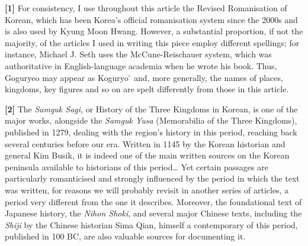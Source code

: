 \documentclass[11pt,a4paper]{article}
\begin{document}
\textbf{{[}1{]}} For consistency, I use throughout this article the Revised Romanisation of Korean, which has been Korea's official romanisation system since the 2000s and is also used by Kyung Moon Hwang. However, a substantial proportion, if not the majority, of the articles I used in writing this piece employ different spellings; for instance, Michael J. Seth uses the McCune-Reischauer system, which was authoritative in English-language academia when he wrote his book. Thus, Goguryeo may appear as Koguryo ̆ and, more generally, the names of places, kingdoms, key figures and so on are spelt differently from those in this article.

\textbf{{[}2{]}} The \emph{Samguk Sagi}, or History of the Three Kingdoms in Korean, is one of the major works, alongside the \emph{Samguk Yusa} (Memorabilia of the Three Kingdoms), published in 1279, dealing with the region's history in this period, reaching back several centuries before our era. Written in 1145 by the Korean historian and general Kim Busik, it is indeed one of the main written sources on the Korean peninsula available to historians of this period\ldots{} Yet certain passages are particularly romanticised and strongly influenced by the period in which the text was written, for reasons we will probably revisit in another series of articles, a period very different from the one it describes. Moreover, the foundational text of Japanese history, the \emph{Nihon Shoki}, and several major Chinese texts, including the \emph{Shiji} by the Chinese historian Sima Qian, himself a contemporary of this period, published in 100 BC, are also valuable sources for documenting it.
\end{document}
